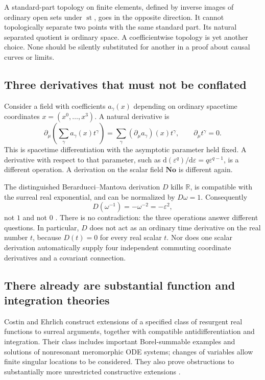\documentclass[11pt,a4paper]{article}
\numberwithin{equation}{section}
\theoremstyle{definition}
\theoremstyle{remark}
\newcommand{\R}{\mathbb R}
\newcommand{\No}{\mathbf{No}}
\newcommand{\st}{\operatorname{st}}
\newcommand{\dd}{\mathrm d}
\begin{document}
A standard-part topology on finite elements, defined by inverse images of
ordinary open sets under $\st$, goes in the opposite direction. It cannot
topologically separate two points with the same standard part. Its natural
separated quotient is ordinary space. A coefficientwise topology is yet another
choice. None should be silently substituted for another in a proof about causal
curves or limits.

\subsection{Three derivatives that must not be conflated}
Consider a field with coefficients $a_\gamma(x)$ depending on ordinary spacetime
coordinates $x=(x^0,\ldots,x^3)$. A natural derivative is
\begin{equation}\label{eq:coeffder}
\partial_\mu\left(\sum_\gamma a_\gamma(x)t^\gamma\right)
 =\sum_\gamma (\partial_\mu a_\gamma)(x)t^\gamma,
\qquad \partial_\mu t^\gamma=0.
\end{equation}
This is spacetime differentiation with the asymptotic parameter held fixed.
A derivative with respect to that parameter, such as
$\dd(\varepsilon^q)/\dd\varepsilon=q\varepsilon^{q-1}$, is a different
operation. A derivation on the scalar field $\No$ is different again.

The distinguished Berarducci--Mantova derivation $D$ kills $\R$, is compatible
with the surreal real exponential, and can be normalized by $D\omega=1$.
Consequently
\begin{equation}\label{eq:BMscale}
D(\omega^{-1})=-\omega^{-2}=-\varepsilon^2,
\end{equation}
not $1$ and not $0$ \cite{BM}. There is no contradiction: the three operations
answer different questions. In particular, $D$ does not act as an ordinary time
derivative on the real number $t$, because $D(t)=0$ for every real scalar $t$.
Nor does one scalar derivation automatically supply four independent commuting
coordinate derivatives and a covariant connection.

\subsection{There already are substantial function and integration theories}
Costin and Ehrlich construct extensions of a specified class of resurgent real
functions to surreal arguments, together with compatible antidifferentiation
and integration. Their class includes important Borel-summable examples and
solutions of nonresonant meromorphic ODE systems; changes of variables allow
finite singular locations to be considered. They also prove obstructions to
substantially more unrestricted constructive extensions \cite{CE}.
\end{document}
